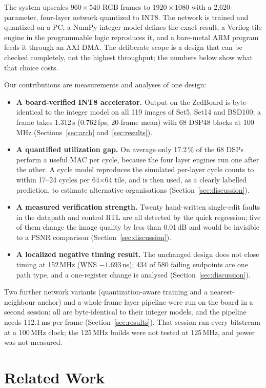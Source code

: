 \documentclass[conference]{IEEEtran}
\begin{document}
The system upscales $960\times540$ RGB frames to $1920\times1080$ with a 2{,}620-parameter, four-layer network quantized to INT8. The network is trained and quantized on a PC, a NumPy integer model defines the exact result, a Verilog tile engine in the programmable logic reproduces it, and a bare-metal ARM program feeds it through an AXI DMA.
The deliberate scope is a design that can be checked completely, not the highest throughput; the numbers below show what that choice costs.

Our contributions are measurements and analyses of one design:
\begin{itemize}
\item \textbf{A board-verified INT8 accelerator.} Output on the ZedBoard is byte-identical to the integer model on all 119 images of Set5, Set14 and BSD100; a frame takes 1.312\,s (0.762\,fps, 20-frame mean) with 68 DSP48 blocks at 100\,MHz (Sections~\ref{sec:arch} and~\ref{sec:results}).
\item \textbf{A quantified utilization gap.} On average only 17.2\,\% of the 68 DSPs perform a useful MAC per cycle, because the four layer engines run one after the other. A cycle model reproduces the simulated per-layer cycle counts to within 17--24 cycles per 64$\times$64 tile, and is then used, as a clearly labelled prediction, to estimate alternative organisations (Section~\ref{sec:discussion}).
\item \textbf{A measured verification strength.} Twenty hand-written single-edit faults in the datapath and control RTL are all detected by the quick regression; five of them change the image quality by less than 0.01\,dB and would be invisible to a PSNR comparison (Section~\ref{sec:discussion}).
\item \textbf{A localized negative timing result.} The unchanged design does not close timing at 152\,MHz (WNS $-1.693$\,ns); 434 of 580 failing endpoints are one path type, and a one-register change is analysed (Section~\ref{sec:discussion}).
\end{itemize}
Two further network variants (quantization-aware training and a nearest-neighbour anchor) and a whole-frame layer pipeline were run on the board in a second session: all are byte-identical to their integer models, and the pipeline needs 112.1\,ms per frame (Section~\ref{sec:results}). That session ran every bitstream at a 100\,MHz clock; the 125\,MHz builds were not tested at 125\,MHz, and power was not measured.

\section{Related Work}
\end{document}
